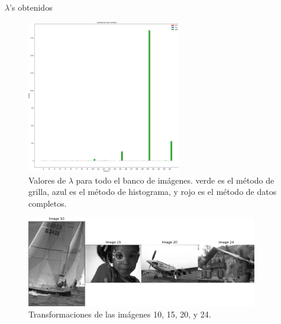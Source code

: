 \documentclass{beamer}
\begin{document}
\begin{frame}{$\lambda$'s obtenidos}
    \begin{figure}[H]
        \centering
        \includegraphics[width=0.6\textwidth]{lambda_noclip.png}
        \caption{Valores de $\lambda$ para todo el banco de im\'agenes. verde es el m\'etodo de grilla, azul es el m\'etodo de histograma, y rojo es el m\'etodo de datos completos.}
        \label{fig:lambda_noclip}
    \end{figure}
    \begin{figure}[H]
        \centering
        \includegraphics[width=0.9\textwidth]{img_ex_10_15_20_24.png}
        \caption{Transformaciones de las im\'agenes 10, 15, 20, y 24.}
        \label{fig:img_bci_10_15_20}
    \end{figure}

\end{frame}
\end{document}
